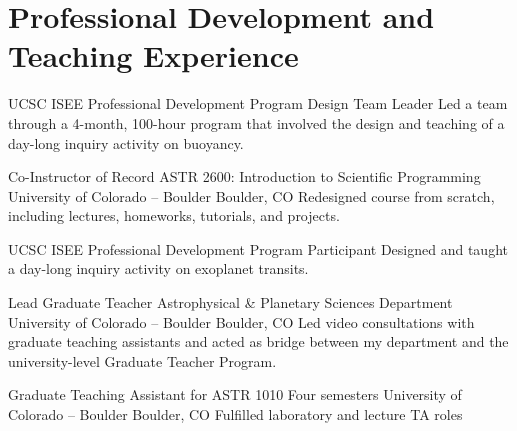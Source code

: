 \section{Professional Development and Teaching Experience}


		{UCSC ISEE Professional Development Program}
		{Design Team Leader}
		{}
		{}
		{Led a team through a 4-month, 100-hour program that involved the design and teaching of a day-long inquiry activity on buoyancy.}

		{Co-Instructor of Record}
		{ASTR 2600: Introduction to Scientific Programming}
		{University of Colorado -- Boulder}
		{Boulder, CO}
		{Redesigned course from scratch, including lectures, homeworks, tutorials, and projects.}

		{UCSC ISEE Professional Development Program}
		{Participant}
		{}
		{}
		{Designed and taught a day-long inquiry activity on exoplanet transits.}

		{Lead Graduate Teacher}
		{Astrophysical \& Planetary Sciences Department}
		{University of Colorado -- Boulder}
		{Boulder, CO}
		{Led video consultations with graduate teaching assistants and acted as bridge between my department and the university-level Graduate Teacher Program.}

		{Graduate Teaching Assistant for ASTR 1010}
		{Four semesters}
		{University of Colorado -- Boulder}
		{Boulder, CO}
		{Fulfilled laboratory and lecture TA roles}
